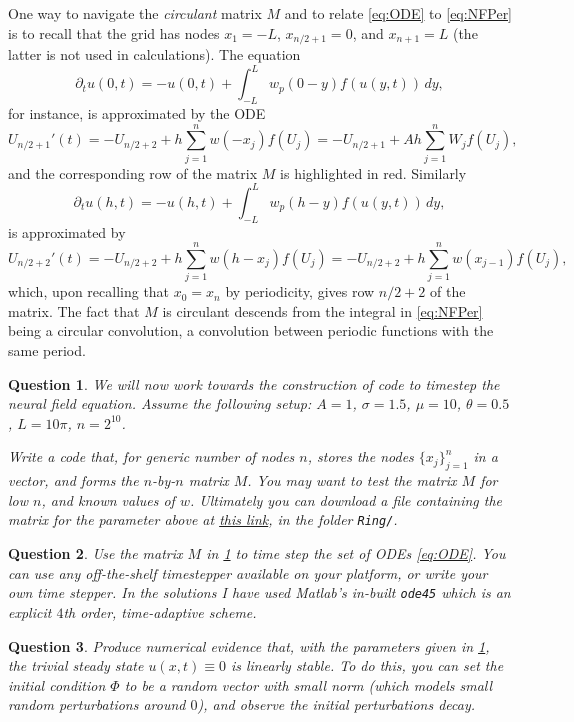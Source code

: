 \documentclass[a4paper]{siamonline220329}
\theoremstyle{plain}
\newtheorem{question}{Question}
\begin{document}
One way to navigate the \textit{circulant} matrix $M$ and to relate \cref{eq:ODE} to
\cref{eq:NFPer} is to
recall that the grid has nodes $x_1=-L$, $x_{n/2+1} = 0$, and $x_{n+1}=L$ (the latter
is not used in calculations). The equation
\[
 \partial_{t}u(0,t) = -u(0,t) + \int_{-L}^Lw_p(0-y)f(u(y,t))\, dy,
\]
for instance, is approximated by the ODE
\[
  U_{n/2+1}'(t) = -U_{n/2+2} + h \sum_{j=1}^n w(-x_j) f(U_j) 
                = -U_{n/2+1} + Ah \sum_{j=1}^n W_jf(U_j) ,
\]
and the corresponding row of the matrix $M$ is highlighted in red. Similarly
\[
 \partial_{t}u(h,t) = -u(h,t) + \int_{-L}^Lw_p(h-y)f(u(y,t))\, dy,
\]
is approximated by
\[
  U_{n/2+2}'(t) = -U_{n/2+2} + h \sum_{j=1}^n w(h-x_j) f(U_j)
                = -U_{n/2+2} + h \sum_{j=1}^n w(x_{j-1}) f(U_j),
\]
which, upon recalling that $x_0=x_n$ by periodicity, gives row $n/2+2$ of the matrix.
The fact that $M$ is circulant descends from the integral in \cref{eq:NFPer} being
a circular convolution, a convolution between periodic functions with the same period.

\begin{question} \label{question:codeMatrix}
  We will now work towards the construction of code to timestep the neural field
  equation. Assume the following setup: $A = 1$, $\sigma=1.5$, $\mu =10$,
  $\theta = 0.5$, $L = 10\pi$, $n = 2^{10}$.

  Write a code that, for generic number of nodes $n$, stores the nodes
  $\{x_j\}_{j=1}^n$ in a vector, and forms the $n$-by-$n$ matrix $M$. You may want to
  test the matrix $M$ for low $n$, and known values of $w$. Ultimately you can
  download a file containing the matrix for the parameter above at 
  \href{https://zenodo.org/records/11120604}{this link}, in the folder
  \texttt{Ring/}.
\end{question}

\begin{question} 
  Use the matrix $M$ in \cref{question:codeMatrix} to time step the set of ODEs
  \cref{eq:ODE}. You can use any off-the-shelf timestepper available on your
  platform, or write your own time stepper. In the solutions I have used Matlab's in-built
  \texttt{ode45} which is an explicit $4$th order, time-adaptive scheme.
\end{question}

\begin{question} 
  Produce numerical evidence that, with the parameters given in
  \cref{question:codeMatrix}, the trivial steady state $u(x,t) \equiv 0$ is linearly
  stable. To do this, you can set the initial condition $\Phi$ to be a random vector
  with small norm (which models small random perturbations around $0$), and observe the
  initial perturbations decay.
\end{question}
\end{document}
